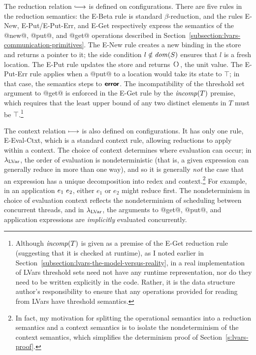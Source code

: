 The reduction relation $\parstepsto$ is defined on
configurations. There are five rules in the reduction semantics: the
{\sc E-Beta} rule is standard $\beta$-reduction, and the rules {\sc
  E-New}, {\sc E-Put}/{\sc E-Put-Err}, and {\sc E-Get} respectively
express the semantics of the @new@, @put@, and @get@ operations
described in Section~\ref{subsection:lvars-communication-primitives}.
The {\sc E-New} rule creates a new binding in the store and returns a
pointer to it; the side condition $l \notin \mathit{dom}(S)$ ensures that $l$
is a fresh location.  The {\sc E-Put} rule updates the store and
returns $\mbox{\texttt{()}}$, the unit value.  The {\sc E-Put-Err} rule applies
when a @put@ to a location would take its state to $\top$; in that
case, the semantics steps to $\textbf{\textsf{error}}$.  The incompatibility of the
threshold set argument to @get@ is enforced in the {\sc E-Get} rule by
the $\mathit{incomp}(T)$ premise, which requires that the least upper bound of
any two distinct elements in $T$ must be $\top$.\footnote{Although
  $\mathit{incomp}(T)$ is given as a premise of the {\sc E-Get} reduction rule
  (suggesting that it is checked at runtime), as I noted earlier in
  Section~\ref{subsection:lvars-the-model-versus-reality}, in a real
  implementation of LVars threshold sets need not have any runtime
  representation, nor do they need to be written explicitly in the
  code.  Rather, it is the data structure author's responsibility to
  ensure that any operations provided for reading from LVars have
  threshold semantics.}

The context relation $\longmapsto$ is also defined on configurations.
It has only one rule, {\sc E-Eval-Ctxt}, which is a standard context
rule, allowing reductions to apply within a context.  The choice of
context determines where evaluation can occur; in $\lambda_{\textrm{LVar}}$, the
order of evaluation is nondeterministic (that is, a given expression
can generally reduce in more than one way), and so it is generally
\emph{not} the case that an expression has a unique decomposition into
redex and context.\footnote{In fact, my motivation for splitting the
  operational semantics into a reduction semantics and a context
  semantics is to isolate the nondeterminism of the context semantics,
  which simplifies the determinism proof of
  Section~\ref{s:lvars-proof}.}  For example, in an application
$e_1~e_2$, either $e_1$ or $e_2$ might reduce first.  The
nondeterminism in choice of evaluation context reflects the
nondeterminism of scheduling between concurrent threads, and in
$\lambda_{\textrm{LVar}}$, the arguments to @get@, @put@, and application
expressions are \emph{implicitly} evaluated concurrently.

